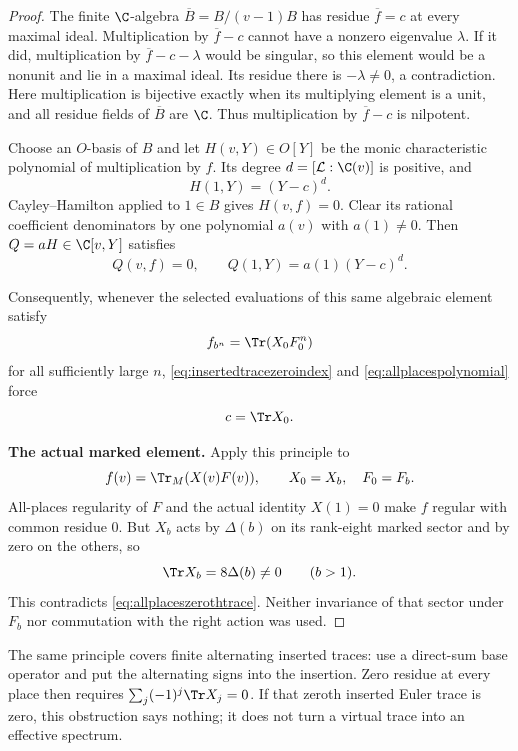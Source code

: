 \begin{proof}
The finite $\C$-algebra $\overline B=B/(v-1)B$
has residue $\overline f=c$ at every maximal ideal.
Multiplication by $\overline f-c$ cannot have a
nonzero eigenvalue $\lambda$.
If it did, multiplication by $\overline f-c-\lambda$
would be singular, so this element would be a nonunit
and lie in a maximal ideal.
Its residue there is $-\lambda\ne0$, a contradiction.
Here multiplication is bijective exactly when its
multiplying element is a unit, and all residue fields
of $\overline B$ are $\C$.
Thus multiplication by $\overline f-c$ is nilpotent.

Choose an $O$-basis of $B$ and let $H(v,Y)\in O[Y]$
be the monic characteristic polynomial of multiplication
by $f$. Its degree $d=[\mathcal L:\C(v)]$ is positive,
and
\[
 H(1,Y)=(Y-c)^d.
\]
Cayley--Hamilton applied to $1\in B$ gives $H(v,f)=0$.
Clear its rational coefficient denominators by one
polynomial $a(v)$ with $a(1)\ne0$.
Then $Q=aH\in\C[v,Y]$ satisfies
\begin{equation}\label{eq:allplacespolynomial}
 Q(v,f)=0,\qquad Q(1,Y)=a(1)(Y-c)^d.
\end{equation}

Consequently, whenever the selected evaluations of
this same algebraic element satisfy
\[
 f_{b^n}=\Tr(X_0F_0^n)
\]
for all sufficiently large $n$,
\eqref{eq:insertedtracezeroindex} and
\eqref{eq:allplacespolynomial} force
\begin{equation}\label{eq:allplaceszerothtrace}
 c=\Tr X_0.
\end{equation}

\par\smallskip\noindent\textbf{The actual marked element.}\quad
Apply this principle to
\[
 f(v)=\Tr_M(X(v)F(v)),\qquad X_0=X_b,\quad F_0=F_b.
\]
All-places regularity of $F$ and the actual identity
$X(1)=0$ make $f$ regular with common residue $0$.
But $X_b$ acts by $\Delta(b)$ on its rank-eight
marked sector and by zero on the others, so
\[
 \Tr X_b=8\Delta(b)\ne0\qquad(b>1).
\]
This contradicts \eqref{eq:allplaceszerothtrace}.
Neither invariance of that sector under $F_b$ nor
commutation with the right action was used.
\end{proof}

The same principle covers finite alternating inserted
traces: use a direct-sum base operator and put the
alternating signs into the insertion.
Zero residue at every place then requires
$\sum_j(-1)^j\Tr X_j=0$.
If that zeroth inserted Euler trace is zero,
this obstruction says nothing; it does not turn
a virtual trace into an effective spectrum.

